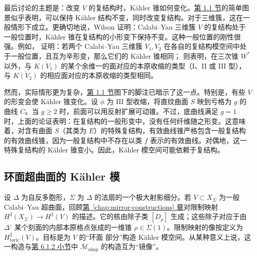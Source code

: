 最后讨论的主题是：改变 $V$ 的复结构时，Kähler 锥如何变化。\hyperref[sec:physics]{第 1.1 节}的简单图景似乎表明，可以保持 Kähler 结构不变，同时改变复结构。对于三维簇，这在一般情形下成立。更确切地说，Wilson  证明：Calabi--Yau 三维簇 $V$ 的复结构处于一般位置时，Kähler 锥在复结构的小形变下保持不变。这种一般位置的刚性很强。例如， 证明：若两个 Calabi--Yau 三维簇 $V_1,V_2$ 在各自的复结构模空间中处于一般位置，且互为辛形变，那么它们的 Kähler 锥相同； 则表明，在三次锥 $W^*$ 以外，与 $\overline{K(V_1)}$ 的某个余维一的面对应的本原收缩的类型（I、II 或 III 型），与 $\overline{K(V_2)}$ 的相应面对应的本原收缩的类型相同。

然而，实际情形更为复杂，\hyperref[sec:physics]{第 1.1 节}图下的脚注已暗示了这一点。特别是，有些 $V$ 的形变会使 Kähler 锥变化。设 $\phi$ 为 III 型收缩，将直纹曲面 $S$ 映到亏格为 $g$ 的曲线 $C$。当 $g\geq2$ 时，前面可以用反射扩展可动锥。不过，底曲线满足 $g=1$ 时，上面的论证表明：在复结构的一般形变中，没有任何纤维随之形变。这意味着，对含有曲面 $S$（其类为 $E$）的特殊复结构，有效曲线锥严格包含一般复结构的有效曲线锥，因为一般复结构中不存在以类 $f$ 表示的有效曲线。对偶地，这一特殊复结构的 Kähler 锥变小。因此，Kähler 模空间可能依赖于复结构。

\subsection{环面超曲面的 Kähler 模}\label{subsec:enlarged-kahler-moduli}
设 $\Delta$ 为自反多胞形，$\Sigma$ 为 $\Delta$ 的法扇的一个极大射影细分。若 $V\subset X_\Sigma$ 为一般 Calabi--Yau 超曲面，回顾\hyperref[chap:mirror-constructions]{第~\ref*{chap:mirror-constructions} 章}对限制映射 $H^2(X_\Sigma)\to H^2(V)$ 的描述。它的核由除子类 $[D_\rho]$ 生成；这些除子对应于由 $\Delta^\circ$ 某个刻面的内部本原格点张成的一维锥 $\rho\in\Sigma(1)$。限制映射的像按定义为 $H_{\mathrm{toric}}^2(V)$。目标是为 $V$ 的“环面
部分”构造 Kähler 模空间。从某种意义上说，这一构造与\hyperref[subsec:toric-complex-moduli]{第 6.1.2 小节}中 $\overline{\mathcal M}_{\mathrm{simp}}$ 的构造互为“镜像”。

